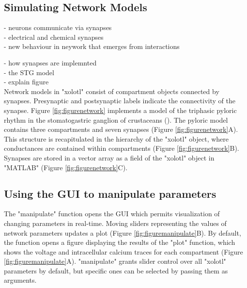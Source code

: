 \documentclass{frontiersSCNS} %
\begin{document}
%
%
%
%
%
%



\subsection{Simulating Network Models}


- neurons communicate via synapses \\
- electrical and chemical synapses \\
- new behaviour in neywork that emerges from interactions

- how synapses are implemnted \\
- the STG model \\
- explain figure \\

Network models in "xolotl" consist of compartment objects connected by synapses. Presynaptic and postsynaptic labels indicate the connectivity of the synapse. Figure \ref{fig:figurenetwork} implements a model of the triphasic pyloric rhythm in the stomatogastric ganglion of crustaceans (\cite{prinzSimilarNetworkActivity2004}). The pyloric model contains three compartments and seven synapses (Figure \ref{fig:figurenetwork}A). This structure is recapitulated in the hierarchy of the "xolotl" object, where conductances are contained within compartments (Figure \ref{fig:figurenetwork}B). Synapses are stored in a vector array as a field of the "xolotl" object in "MATLAB" (Figure \ref{fig:figurenetwork}C).



%
%
%
%
%
%

\subsection{Using the GUI to manipulate parameters}

The "manipulate" function opens the GUI which permits visualization of changing parameters in real-time. Moving sliders representing the values of network parameters updates a plot (Figure \ref{fig:figuremanipulate}B). By default, the function opens a figure displaying the results of the "plot" function, which shows the voltage and intracellular calcium traces for each compartment (Figure \ref{fig:figuremanipulate}A). "manipulate" grants slider control over all "xolotl" parameters by default, but specific ones can be selected by passing them as arguments.
\end{document}

